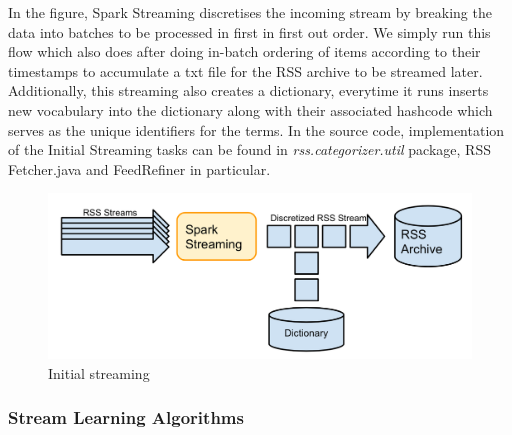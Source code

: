 \documentclass{article} %
\begin{document}
In the figure, Spark Streaming discretises the incoming stream by breaking the data into batches to be processed in first in first out order. We simply run this flow which also does after doing in-batch ordering of items according to their timestamps to accumulate a txt file for the RSS archive to be streamed later. Additionally, this streaming also creates a dictionary, everytime it runs inserts new vocabulary into the dictionary along with their associated hashcode which serves as the unique identifiers for the terms. In the source code, implementation of the Initial Streaming tasks can be found in \textit{rss.categorizer.util} package, RSS Fetcher.java and FeedRefiner in particular.
\begin{figure}[htbp]
  \centering
  \includegraphics[scale=0.28]{./figures/initial_streaming.png}
  \caption{Initial streaming}
\end{figure}


\subsubsection{Stream Learning Algorithms}
\end{document}
